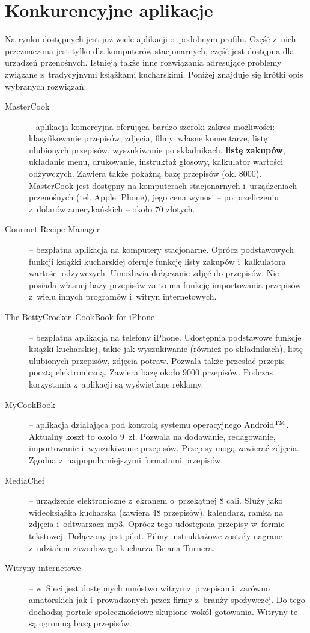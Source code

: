 \documentclass[12pt,leqno, twoside]{mwart}
\def\tm{\leavevmode\hbox{$\rm {}^{TM}$}}
\begin{document}
\section{Konkurencyjne aplikacje}
Na rynku dostępnych jest już wiele aplikacji o~podobnym profilu. Część z~nich przeznaczona jest tylko dla komputerów stacjonarnych, część jest dostępna dla urządzeń przenośnych. Istnieją także inne rozwiązania adresujące problemy związane z~tradycyjnymi książkami kucharskimi. Poniżej znajduje się krótki opis wybranych rozwiązań:
\begin{description}
  \item[MasterCook] -- aplikacja komercyjna oferująca bardzo szeroki zakres możliwości: klasyfikowanie przepisów, zdjęcia, filmy, własne komentarze, listę ulubionych przepisów, wyszukiwanie po składnikach, \textbf{listę zakupów}, układanie menu, drukowanie, instruktaż głosowy, kalkulator wartości odżywczych. Zawiera także pokaźną bazę przepisów (ok. 8000). Master\nolinebreak[4]Cook jest dostępny na komputerach stacjonarnych i~urządzeniach przenośnych (tel. Apple iPhone), jego cena wynosi -- po przeliczeniu z~dolarów amerykańskich -- około 70 złotych.
  \item[Gourmet Recipe Manager] -- bezpłatna aplikacja na komputery stacjonarne. Oprócz podstawowych funkcji książki kucharskiej oferuje funkcję listy zakupów i~kalkulatora wartości odżywczych. Umożliwia dołączanie zdjęć do przepisów. Nie posiada własnej bazy przepisów za to ma funkcję importowania przepisów z~wielu innych programów i~witryn internetowych.
  \item[The BettyCrocker\textregistered\ CookBook for iPhone] -- bezpłatna aplikacja na telefony iPhone. Udostępnia podstawowe funkcje książki kucharskiej, takie jak wyszukiwanie (również po składnikach), listę ulubionych przepisów, zdjęcia potraw. Pozwala także przesłać przepis pocztą elektroniczną. Zawiera bazę około 9000 przepisów. Podczas korzystania z~aplikacji są wyświetlane reklamy.
\vfill\pagebreak
  \item[MyCookBook] -- aplikacja działająca pod kontrolą systemu operacyjnego Android\tm. Aktualny koszt to około 9~zł. Pozwala na dodawanie, redagowanie, importowanie i~wyszukiwanie przepisów. Przepisy mogą zawierać zdjęcia. Zgodna z~najpopularniejszymi formatami przepisów.
  \item[MediaChef\textregistered] -- urządzenie elektroniczne z~ekranem o~przekątnej 8 cali. Służy jako wideoksiążka kucharska (zawiera 48 przepisów), kalendarz, ramka na zdjęcia i~odtwarzacz mp3. Oprócz tego udostępnia przepisy w~formie tekstowej. Dołączony jest pilot. Filmy instruktażowe zostały nagrane z~udziałem zawodowego kucharza Briana Turnera.
  \item[Witryny internetowe] -- w~Sieci jest dostępnych mnóstwo witryn z~przepisami, zarówno amatorskich jak i~prowadzonych przez firmy z~branży spożywczej. Do tego dochodzą portale społecznościowe skupione wokół gotowania. Witryny te są ogromną bazą przepisów.
\end{description}
\end{document}
